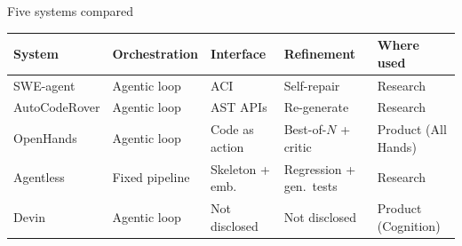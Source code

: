 \documentclass[
  aspectratio=169,
  font=times,
  sectionpage=true,
]{tumbeamer}
\begin{document}
\begin{frame}{Five systems compared}
  \label{fr:systems}
  \scriptsize
  \setlength{\tabcolsep}{4pt}
  \begin{tabular}{@{}L{0.18\textwidth}L{0.16\textwidth}L{0.18\textwidth}L{0.20\textwidth}L{0.18\textwidth}@{}}
    \toprule
    \textbf{System}
      & \textbf{Orchestration}
      & \textbf{Interface}
      & \textbf{Refinement}
      & \textbf{Where used} \\
    \midrule
    SWE-agent
      & Agentic loop
      & ACI
      & Self-repair
      & Research \\
    \addlinespace
    AutoCodeRover
      & Agentic loop
      & AST APIs
      & Re-generate
      & Research \\
    \addlinespace
    OpenHands
      & Agentic loop
      & Code as action
      & Best-of-$N$ + critic
      & Product (All Hands) \\
    \addlinespace
    Agentless
      & Fixed pipeline
      & Skeleton + emb.
      & Regression + gen.\ tests
      & Research \\
    \addlinespace
    Devin
      & Agentic loop
      & Not disclosed
      & Not disclosed
      & Product (Cognition) \\
    \bottomrule
  \end{tabular}
\end{frame}


\end{document}
